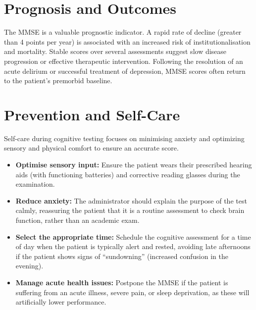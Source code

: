\section*{Prognosis and Outcomes}
The MMSE is a valuable prognostic indicator. A rapid rate of decline (greater than 4 points per year) is associated with an increased risk of institutionalisation and mortality. Stable scores over several assessments suggest slow disease progression or effective therapeutic intervention. Following the resolution of an acute delirium or successful treatment of depression, MMSE scores often return to the patient's premorbid baseline.

\section*{Prevention and Self-Care}
Self-care during cognitive testing focuses on minimising anxiety and optimizing sensory and physical comfort to ensure an accurate score.
\begin{itemize}
    \item \textbf{Optimise sensory input:} Ensure the patient wears their prescribed hearing aids (with functioning batteries) and corrective reading glasses during the examination.
    \item \textbf{Reduce anxiety:} The administrator should explain the purpose of the test calmly, reassuring the patient that it is a routine assessment to check brain function, rather than an academic exam.
    \item \textbf{Select the appropriate time:} Schedule the cognitive assessment for a time of day when the patient is typically alert and rested, avoiding late afternoons if the patient shows signs of ``sundowning'' (increased confusion in the evening).
    \item \textbf{Manage acute health issues:} Postpone the MMSE if the patient is suffering from an acute illness, severe pain, or sleep deprivation, as these will artificially lower performance.
\end{itemize}

